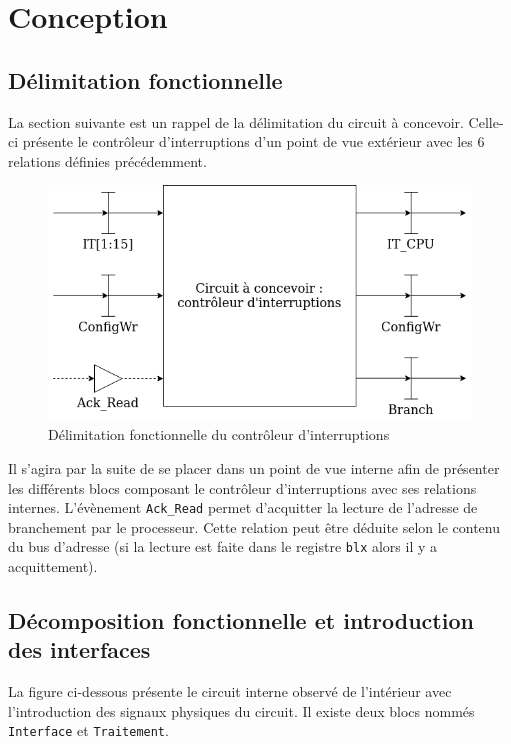 \section{Conception}

\subsection{Délimitation fonctionnelle}

La section suivante est un rappel de la délimitation du circuit à concevoir. Celle-ci présente le contrôleur d'interruptions d'un point de vue extérieur avec les 6 relations définies précédemment.

\begin{figure}[H]
	\centering
	\includegraphics[width=0.6\linewidth]{figure/delimitation_fonctionnelle.png}
	\caption{Délimitation fonctionnelle du contrôleur d'interruptions}
	\label{fig:delimitation_fonctionnelle}
\end{figure}

Il s'agira par la suite de se placer dans un point de vue interne afin de présenter les différents blocs composant le contrôleur d'interruptions avec ses relations internes.
L'évènement \texttt{Ack\_Read} permet d'acquitter la lecture de l'adresse de branchement par le processeur. Cette relation peut être déduite selon le contenu du bus d'adresse (si la lecture est faite dans le registre \texttt{blx} alors il y a acquittement).  

\subsection{Décomposition fonctionnelle et introduction des interfaces}

La figure ci-dessous présente le circuit interne observé de l'intérieur avec l'introduction des signaux physiques du circuit. Il existe deux blocs nommés \texttt{Interface} et \texttt{Traitement}. 

